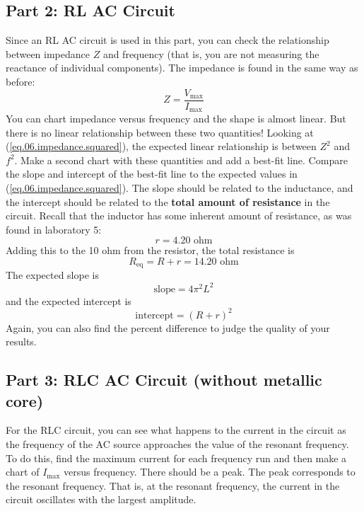 \subsection{Part 2: RL AC Circuit}
%
Since an RL AC circuit is used in this part, you can check the relationship between impedance $Z$ and frequency (that is, you are not measuring the reactance of individual components). The impedance is found in the same way as before:
\begin{equation}
	Z = \frac{V_{\text{max}}}{I_{\text{max}}}
\end{equation}
You can chart impedance versus frequency and the shape is almost linear. But there is no linear relationship between these two quantities! Looking at (\ref{eq.06.impedance.squared}), the expected linear relationship is between $Z^{2}$ and $f^{2}$. Make a second chart with these quantities and add a best-fit line. Compare the slope and intercept of the best-fit line to the expected values in (\ref{eq.06.impedance.squared}). The slope should be related to the inductance, and the intercept should be related to the \textbf{total amount of resistance} in the circuit. Recall that the inductor has some inherent amount of resistance, as was found in laboratory 5:
\begin{equation}
	r = 4.20 \text{ ohm}
\end{equation}
Adding this to the 10 ohm from the resistor, the total resistance is
\begin{equation}
	R_{\text{eq}} = R + r = 14.20 \text{ ohm}
\end{equation}
The expected slope is
\begin{equation}
	\text{slope} = 4 \pi^{2} L^{2}
\end{equation}
and the expected intercept is
\begin{equation}
	\text{intercept} = (R + r)^{2}
\end{equation}
Again, you can also find the percent difference to judge the quality of your results.
%
\subsection{Part 3: RLC AC Circuit (without metallic core)}
%
For the RLC circuit, you can see what happens to the current in the circuit as the frequency of the AC source  approaches the value of the resonant frequency. To do this, find the maximum current for each frequency run and then make a chart of $I_{\text{max}}$ versus frequency. There should be a peak. The peak corresponds to the resonant frequency. That is, at the resonant frequency, the current in the circuit oscillates with the largest amplitude.


